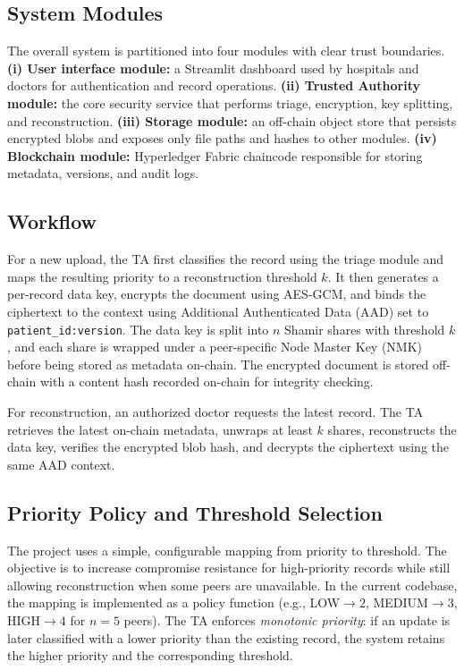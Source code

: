 \documentclass{IEEEtran}
\begin{document}
\subsection{System Modules}
The overall system is partitioned into four modules with clear trust boundaries. \textbf{(i) User interface module:} a Streamlit dashboard used by hospitals and doctors for authentication and record operations. \textbf{(ii) Trusted Authority module:} the core security service that performs triage, encryption, key splitting, and reconstruction. \textbf{(iii) Storage module:} an off-chain object store that persists encrypted blobs and exposes only file paths and hashes to other modules. \textbf{(iv) Blockchain module:} Hyperledger Fabric chaincode responsible for storing metadata, versions, and audit logs.

\subsection{Workflow}
For a new upload, the TA first classifies the record using the triage module and maps the resulting priority to a reconstruction threshold $k$. It then generates a per-record data key, encrypts the document using AES-GCM, and binds the ciphertext to the context using Additional Authenticated Data (AAD) set to \texttt{patient\_id:version}. The data key is split into $n$ Shamir shares with threshold $k$, and each share is wrapped under a peer-specific Node Master Key (NMK) before being stored as metadata on-chain. The encrypted document is stored off-chain with a content hash recorded on-chain for integrity checking.

For reconstruction, an authorized doctor requests the latest record. The TA retrieves the latest on-chain metadata, unwraps at least $k$ shares, reconstructs the data key, verifies the encrypted blob hash, and decrypts the ciphertext using the same AAD context.

\subsection{Priority Policy and Threshold Selection}
The project uses a simple, configurable mapping from priority to threshold. The objective is to increase compromise resistance for high-priority records while still allowing reconstruction when some peers are unavailable. In the current codebase, the mapping is implemented as a policy function (e.g., LOW$\rightarrow2$, MEDIUM$\rightarrow3$, HIGH$\rightarrow4$ for $n=5$ peers). The TA enforces \emph{monotonic priority}: if an update is later classified with a lower priority than the existing record, the system retains the higher priority and the corresponding threshold.
\end{document}
